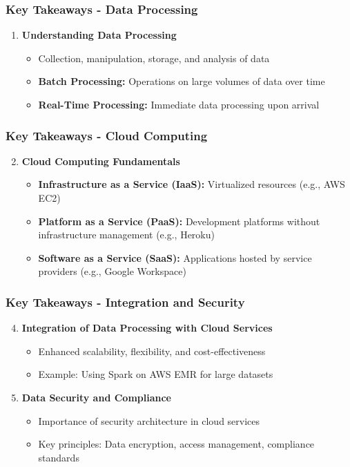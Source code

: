 \documentclass[aspectratio=169]{beamer}
\begin{document}
\begin{frame}[fragile]
    \frametitle{Key Takeaways - Data Processing}
    \begin{enumerate}
        \item \textbf{Understanding Data Processing}
            \begin{itemize}
                \item Collection, manipulation, storage, and analysis of data
                \item \textbf{Batch Processing:} Operations on large volumes of data over time
                \item \textbf{Real-Time Processing:} Immediate data processing upon arrival
            \end{itemize}
    \end{enumerate}
\end{frame}

\begin{frame}[fragile]
    \frametitle{Key Takeaways - Cloud Computing}
    \begin{enumerate}
        \setcounter{enumi}{1}
        \item \textbf{Cloud Computing Fundamentals}
            \begin{itemize}
                \item \textbf{Infrastructure as a Service (IaaS):} Virtualized resources (e.g., AWS EC2)
                \item \textbf{Platform as a Service (PaaS):} Development platforms without infrastructure management (e.g., Heroku)
                \item \textbf{Software as a Service (SaaS):} Applications hosted by service providers (e.g., Google Workspace)
            \end{itemize}
    \end{enumerate}
\end{frame}

\begin{frame}[fragile]
    \frametitle{Key Takeaways - Integration and Security}
    \begin{enumerate}
        \setcounter{enumi}{3}
        \item \textbf{Integration of Data Processing with Cloud Services}
            \begin{itemize}
                \item Enhanced scalability, flexibility, and cost-effectiveness
                \item Example: Using Spark on AWS EMR for large datasets
            \end{itemize}
        \item \textbf{Data Security and Compliance}
            \begin{itemize}
                \item Importance of security architecture in cloud services
                \item Key principles: Data encryption, access management, compliance standards
            \end{itemize}
    \end{enumerate}
\end{frame}
\end{document}
